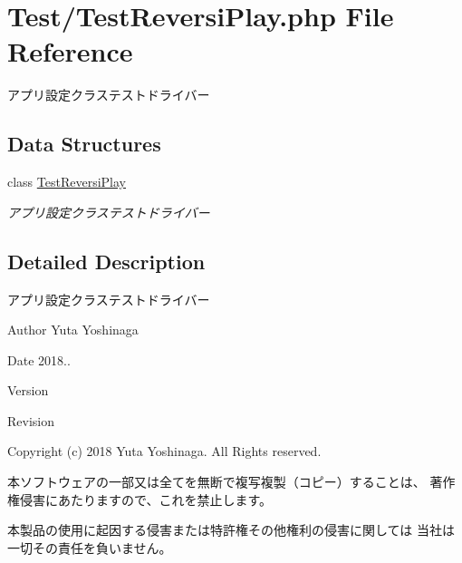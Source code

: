 \hypertarget{_test_reversi_play_8php}{}\section{Test/\+Test\+Reversi\+Play.php File Reference}
\label{_test_reversi_play_8php}


アプリ設定クラステストドライバー  


\subsection*{Data Structures}
\begin{DoxyCompactItemize}
\item 
class \hyperlink{class_test_reversi_play}{Test\+Reversi\+Play}
\begin{DoxyCompactList}\small\item\em アプリ設定クラステストドライバー \end{DoxyCompactList}\end{DoxyCompactItemize}


\subsection{Detailed Description}
アプリ設定クラステストドライバー 

\begin{DoxyAuthor}{Author}
Yuta Yoshinaga 
\end{DoxyAuthor}
\begin{DoxyDate}{Date}
2018.. 
\end{DoxyDate}
\begin{DoxyParagraph}{Version}

\end{DoxyParagraph}
\begin{DoxyParagraph}{Revision}

\end{DoxyParagraph}


Copyright (c) 2018 Yuta Yoshinaga. All Rights reserved.


\begin{DoxyItemize}
\item 本ソフトウェアの一部又は全てを無断で複写複製（コピー）することは、 著作権侵害にあたりますので、これを禁止します。
\item 本製品の使用に起因する侵害または特許権その他権利の侵害に関しては 当社は一切その責任を負いません。 
\end{DoxyItemize}